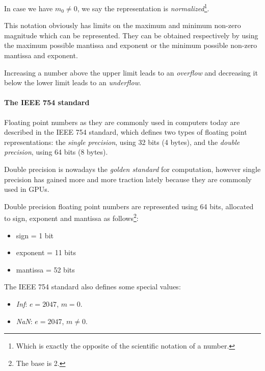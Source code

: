 \begin{Rem}
	In case we have $m_0 \neq 0$,  we say the representation is \emph{normalized}\footnote{Which is exactly the opposite of the scientific notation of a number.}.
\end{Rem}

\begin{Rem}
	This notation obviously has limits on the maximum and minimum non-zero magnitude which can be represented. They can be obtained respectively by using the maximum possible mantissa and exponent or the minimum possible non-zero mantissa and exponent.

	Increasing a number above the upper limit leads to an \emph{overflow} and decreasing it below the lower limit leads to an \emph{underflow}.
\end{Rem}

\paragraph{The IEEE 754 standard}
Floating point numbers as they are commonly used in computers today are described in the IEEE 754 standard, which defines two types of floating point representations: the \emph{single precision}, using 32 bits (4 bytes), and the \emph{double precision}, using 64 bits (8 bytes).

Double precision is nowadays the \emph{golden standard} for computation, however single precision has gained more and more traction lately because they are commonly used in GPUs.

\begin{Def}
	Double precision floating point numbers are represented using 64 bits, allocated to sign, exponent and mantissa as follows\footnote{The base is 2.}:
	\begin{itemize}
		\item sign = 1 bit
		\item exponent = 11 bits
		\item mantissa = 52 bits
	\end{itemize}
\end{Def}

The IEEE 754 standard also defines some special values:
\begin{itemize}
	\item \emph{Inf}: $e = 2047$, $m = 0$.
	\item \emph{NaN}: $e = 2047$, $m \neq 0$.
\end{itemize}

